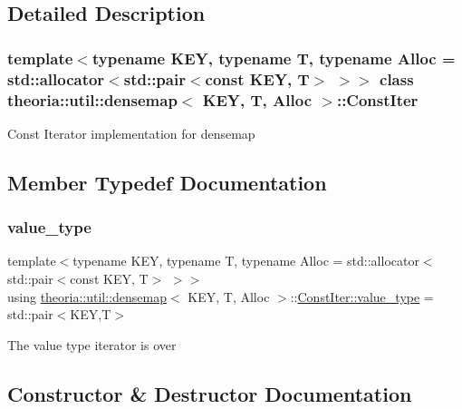 \subsection{Detailed Description}
\subsubsection*{template$<$typename K\+EY, typename T, typename Alloc = std\+::allocator$<$std\+::pair$<$const K\+E\+Y, T$>$ $>$$>$\newline
class theoria\+::util\+::densemap$<$ K\+E\+Y, T, Alloc $>$\+::\+Const\+Iter}

Const Iterator implementation for densemap 

\subsection{Member Typedef Documentation}
\mbox{\label{classtheoria_1_1util_1_1densemap_1_1ConstIter_a061fb76ecf5498d6033472fa66635d4a}} 
\subsubsection{\texorpdfstring{value\+\_\+type}{value\_type}}
{\footnotesize\ttfamily template$<$typename K\+EY, typename T, typename Alloc = std\+::allocator$<$std\+::pair$<$const K\+E\+Y, T$>$ $>$$>$ \\
using \hyperlink{classtheoria_1_1util_1_1densemap}{theoria\+::util\+::densemap}$<$ K\+EY, T, Alloc $>$\+::\hyperlink{classtheoria_1_1util_1_1densemap_1_1ConstIter_a061fb76ecf5498d6033472fa66635d4a}{Const\+Iter\+::value\+\_\+type} =  std\+::pair$<$K\+EY,T$>$}

The value type iterator is over 

\subsection{Constructor \& Destructor Documentation}
\mbox{\label{classtheoria_1_1util_1_1densemap_1_1ConstIter_abd8d4df894cc2e37089ebe1a2bedd77d}} 
